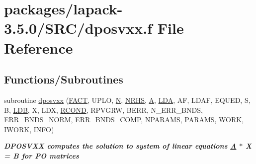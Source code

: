 \hypertarget{dposvxx_8f}{}\section{packages/lapack-\/3.5.0/\+S\+R\+C/dposvxx.f File Reference}
\label{dposvxx_8f}
\subsection*{Functions/\+Subroutines}
\begin{DoxyCompactItemize}
\item 
subroutine \hyperlink{group__doublePOsolve_ga423141487077727ec3bc52edd1fccd44}{dposvxx} (\hyperlink{superlu__enum__consts_8h_af00a42ecad444bbda75cde1b64bd7e72a1b6692b56d378abb85bd49063721d034}{F\+A\+C\+T}, U\+P\+L\+O, \hyperlink{polmisc_8c_a0240ac851181b84ac374872dc5434ee4}{N}, \hyperlink{example__user_8c_aa0138da002ce2a90360df2f521eb3198}{N\+R\+H\+S}, \hyperlink{classA}{A}, \hyperlink{example__user_8c_ae946da542ce0db94dced19b2ecefd1aa}{L\+D\+A}, A\+F, L\+D\+A\+F, E\+Q\+U\+E\+D, S, B, \hyperlink{example__user_8c_a50e90a7104df172b5a89a06c47fcca04}{L\+D\+B}, X, L\+D\+X, \hyperlink{superlu__enum__consts_8h_af00a42ecad444bbda75cde1b64bd7e72a9b5c151728d8512307565994c89919d5}{R\+C\+O\+N\+D}, R\+P\+V\+G\+R\+W, B\+E\+R\+R, N\+\_\+\+E\+R\+R\+\_\+\+B\+N\+D\+S, E\+R\+R\+\_\+\+B\+N\+D\+S\+\_\+\+N\+O\+R\+M, E\+R\+R\+\_\+\+B\+N\+D\+S\+\_\+\+C\+O\+M\+P, N\+P\+A\+R\+A\+M\+S, P\+A\+R\+A\+M\+S, W\+O\+R\+K, I\+W\+O\+R\+K, I\+N\+F\+O)
\begin{DoxyCompactList}\small\item\em {\bfseries  D\+P\+O\+S\+V\+X\+X computes the solution to system of linear equations \hyperlink{classA}{A} $\ast$ X = B for P\+O matrices} \end{DoxyCompactList}\end{DoxyCompactItemize}
